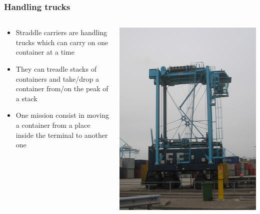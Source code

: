 \documentclass{beamer}
\begin{document}
\begin{frame}
 \frametitle{Handling trucks}
\begin{columns}
  \begin{column}[l]{8cm}
    \begin{itemize}
    \item Straddle carriers are handling trucks which can carry on one container at a time
    \item They can treadle stacks of containers and take/drop a container from/on the peak of a stack
    \item One mission consist in moving a container from a place inside the terminal to another one
    \end{itemize}
  \end{column}
  \begin{column}[r]{3cm}
	\begin{flushright}
	    \includegraphics[height=.5\textheight]{fig/Containerlift_straddle_carrier.jpg}
	\end{flushright}
  \end{column}
\end{columns}	
\end{frame}
\end{document}
